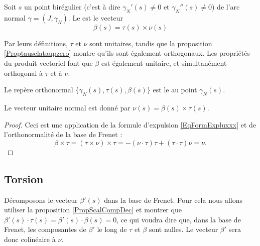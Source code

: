 \begin{definition}
    Soit $s$ un point birégulier (c'est à dire $\gamma_N'(s)\neq 0$ et $\gamma_N''(s)\neq 0$) de l'arc normal $\gamma=(J,\gamma_N)$. Le  est le vecteur
    \begin{equation}
        \beta(s)=\tau(s)\times\nu(s)
    \end{equation}
\end{definition}

Par leurs définitions, $\tau$ et $\nu$ sont unitaires, tandis que la proposition \ref{Proptausclataupzero} montre qu'ils sont également orthogonaux. Les propriétés du produit vectoriel font que $\beta$ est également unitaire, et simultanément orthogonal à $\tau$ et à $\nu$.

\begin{definition}
    Le repère orthonormal $\{ \gamma_N(s),\tau(s),\beta(s) \}$ est le  au point $\gamma_N(s)$.
\end{definition}

\begin{lemma}
    Le  vecteur unitaire normal est donné par $\nu(s)=\beta(s)\times \tau(s)$.
\end{lemma}

\begin{proof}
    Ceci est une application de la formule d'expulsion \eqref{EqFormExpluxxx} et de l'orthonormalité de la base de Frenet :
    \begin{equation}
        \beta\times\tau=(\tau\times\nu)\times\tau=-(\nu\cdot\tau)\tau+(\tau\cdot\tau)\nu=\nu.
    \end{equation}
\end{proof}

\subsection{Torsion}

Décomposons le vecteur $\beta'(s)$ dans la base de Frenet. Pour cela nous allons utiliser la proposition \ref{PropScalCompDec} et montrer que $\beta'(s)\cdot \tau(s)=\beta'(s)\cdot\beta(s)=0$, ce qui voudra dire que, dans la base de Frenet, les composantes de $\beta'$ le long de $\tau$ et $\beta$ sont nulles. Le vecteur $\beta'$ sera donc colinéaire à $\nu$.

